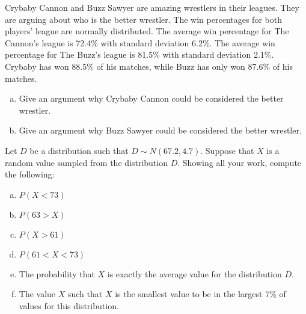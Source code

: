 \documentclass[11pt,letterpaper]{article}
\begin{document}

 Crybaby Cannon and Buzz Sawyer are amazing wrestlers in their leagues. They are arguing about who is the better wrestler. The win percentages for both players' league are normally distributed. The average win percentage for The Cannon's league is 72.4\% with standard deviation 6.2\%. The average win percentage for The Buzz's league is 81.5\% with standard deviation 2.1\%. Crybaby has won 88.5\% of his matches, while Buzz has only won 87.6\% of his matches. 
	\begin{enumerate}[(a)]
	\item Give an argument why Crybaby Cannon could be considered the better wrestler. 
	\item Give an argument why Buzz Sawyer could be considered the better wrestler.
	\end{enumerate}



\newpage



 Let $D$ be a distribution such that $D \sim N(67.2, 4.7)$. Suppose that $X$ is a random value sampled from the distribution $D$. Showing all your work, compute the following:
	\begin{enumerate}[(a)]
	\item $P(X < 73)$
	\item $P(63 > X)$
	\item $P(X > 61)$
	\item $P(61 < X < 73)$
	\item The probability that $X$ is exactly the average value for the distribution $D$. 
	\item The value $X$ such that $X$ is the smallest value to be in the largest 7\% of values for this distribution. 
	\end{enumerate}
\end{document}
